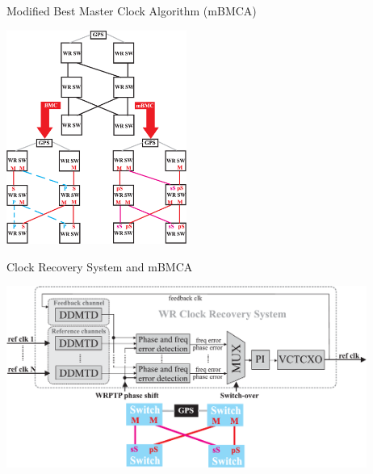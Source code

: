 \documentclass[compress,red]{beamer}
\newcommand{\backupend}{
   \addtocounter{framenumberappendix}{-\value{framenumber}}
   \addtocounter{framenumber}{\value{framenumberappendix}} 
}
\begin{document}
\begin{frame}{Modified Best Master Clock Algorithm (mBMCA)}

    \begin{center}
    \includegraphics[height=7.0cm]{protocol/mBMCvsBMC.pdf}
    \end{center}


\end{frame}
\begin{frame}{Clock Recovery System and mBMCA}


  \begin{center}
  \includegraphics[width=11.8cm]{protocol/wrCRS_plus_mBMC.pdf}
  \end{center}

\end{frame}




\backupend

\end{document}
